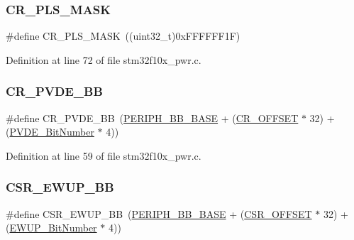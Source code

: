 \subsubsection{\texorpdfstring{C\+R\+\_\+\+P\+L\+S\+\_\+\+M\+A\+SK}{CR\_PLS\_MASK}}
{\footnotesize\ttfamily \#define C\+R\+\_\+\+P\+L\+S\+\_\+\+M\+A\+SK~((uint32\+\_\+t)0x\+F\+F\+F\+F\+F\+F1\+F)}



Definition at line 72 of file stm32f10x\+\_\+pwr.\+c.

\mbox{\label{group___p_w_r___private___defines_ga49f51ef8285a6be76fd204d49a00709c}} 
\subsubsection{\texorpdfstring{C\+R\+\_\+\+P\+V\+D\+E\+\_\+\+BB}{CR\_PVDE\_BB}}
{\footnotesize\ttfamily \#define C\+R\+\_\+\+P\+V\+D\+E\+\_\+\+BB~(\hyperlink{group___peripheral__memory__map_gaed7efc100877000845c236ccdc9e144a}{P\+E\+R\+I\+P\+H\+\_\+\+B\+B\+\_\+\+B\+A\+SE} + (\hyperlink{group___r_c_c___private___defines_gafa1d3d0ea72132df651c76fc1bdffffc}{C\+R\+\_\+\+O\+F\+F\+S\+ET} $\ast$ 32) + (\hyperlink{group___p_w_r___private___defines_ga17d618eb800c401ef9c6789c9374eaf8}{P\+V\+D\+E\+\_\+\+Bit\+Number} $\ast$ 4))}



Definition at line 59 of file stm32f10x\+\_\+pwr.\+c.

\mbox{\label{group___p_w_r___private___defines_gaaff864595f697850b19173b0bca991b0}} 
\subsubsection{\texorpdfstring{C\+S\+R\+\_\+\+E\+W\+U\+P\+\_\+\+BB}{CSR\_EWUP\_BB}}
{\footnotesize\ttfamily \#define C\+S\+R\+\_\+\+E\+W\+U\+P\+\_\+\+BB~(\hyperlink{group___peripheral__memory__map_gaed7efc100877000845c236ccdc9e144a}{P\+E\+R\+I\+P\+H\+\_\+\+B\+B\+\_\+\+B\+A\+SE} + (\hyperlink{group___r_c_c___private___defines_ga984cbe73312b6d3d355c5053763d499a}{C\+S\+R\+\_\+\+O\+F\+F\+S\+ET} $\ast$ 32) + (\hyperlink{group___p_w_r___private___defines_ga94fe0520e8f9b71fa2b99c0565ec70ea}{E\+W\+U\+P\+\_\+\+Bit\+Number} $\ast$ 4))}



